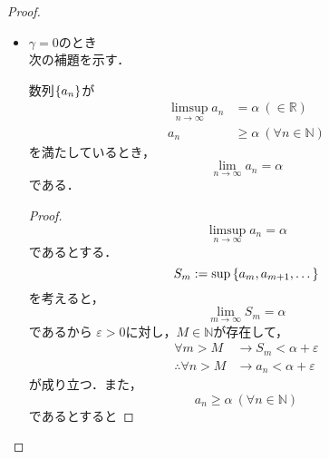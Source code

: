 \begin{enumerate}[(1)]
\begin{enumerate}[(i)]
        \begin{proof}
            \begin{itemize}
                \item $\gamma=0$のとき\\
                次の補題を示す．
                \begin{lemma}\label{lem:limsup_lim}
                    数列$\qty{a_n}$が
                    \begin{align}
                        \limsup_{n\to\infty}a_n&=\alpha\ (\in\mathbb{R})\\
                        a_n&\ge \alpha\ (\forall n\in\mathbb{N})
                    \end{align}
                    を満たしているとき，
                    \begin{equation}
                        \lim_{n\to\infty}a_n=\alpha
                    \end{equation}
                    である．
                \end{lemma}
                \begin{proof}
                    \begin{equation}
                        \limsup_{n\to\infty}a_n=\alpha
                    \end{equation}
                    であるとする．
                    \begin{equation}
                        S_m:=\sup\qty{a_m,a_{m+1},\dots}
                    \end{equation}
                    を考えると，
                    \begin{equation}
                        \lim_{m\to\infty}S_m=\alpha
                    \end{equation}
                    であるから
                    $\varepsilon>0$に対し，$M\in\mathbb{N}$が存在して，
                    \begin{align}
                        \forall m>M &\to S_m<\alpha+\varepsilon\\
                        \therefore
                        \forall n>M &\to a_n<\alpha+\varepsilon \label{eq:3_3_right}
                    \end{align}
                    が成り立つ．また，
                    \begin{equation}
                        a_n\ge \alpha\ (\forall n\in\mathbb{N})
                    \end{equation}
                    であるとすると

\end{proof}
\end{itemize}
\end{proof}
\end{enumerate}
\end{enumerate}
